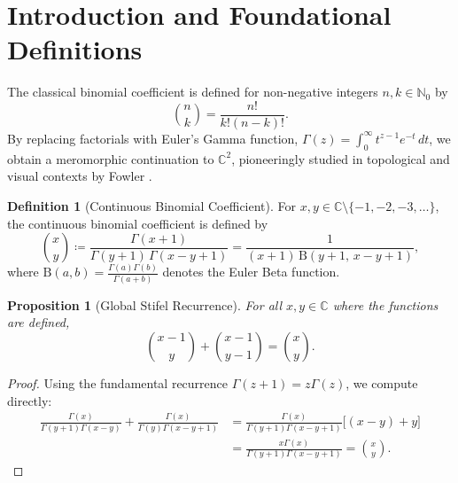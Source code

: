\documentclass[11pt,a4paper]{article}
\theoremstyle{plain}
\newtheorem{proposition}[theorem]{Proposition}
\theoremstyle{definition}
\newtheorem{definition}[theorem]{Definition}
\theoremstyle{remark}
\numberwithin{equation}{section}
\begin{document}
\tableofcontents
\newpage

\section{Introduction and Foundational Definitions}

The classical binomial coefficient is defined for non-negative integers $n, k \in \mathbb{N}_0$ by
\begin{equation}
\binom{n}{k} = \frac{n!}{k!(n-k)!}.
\end{equation}
By replacing factorials with Euler's Gamma function, $\Gamma(z) = \int_0^\infty t^{z-1}e^{-t}\,dt$, we obtain a meromorphic continuation to $\mathbb{C}^2$, pioneeringly studied in topological and visual contexts by Fowler \cite{fowler1996}.

\begin{definition}[Continuous Binomial Coefficient]
For $x, y \in \mathbb{C} \setminus \{-1, -2, -3, \dots\}$, the continuous binomial coefficient is defined by
\begin{equation}
\binom{x}{y} \coloneqq \frac{\Gamma(x+1)}{\Gamma(y+1)\,\Gamma(x-y+1)} = \frac{1}{(x+1)\,\mathrm{B}(y+1,\, x-y+1)},
\end{equation}
where $\mathrm{B}(a, b) = \frac{\Gamma(a)\Gamma(b)}{\Gamma(a+b)}$ denotes the Euler Beta function.
\end{definition}

\begin{proposition}[Global Stifel Recurrence]
For all $x, y \in \mathbb{C}$ where the functions are defined,
\begin{equation}
\binom{x-1}{y} + \binom{x-1}{y-1} = \binom{x}{y}.
\end{equation}
\end{proposition}
\begin{proof}
Using the fundamental recurrence $\Gamma(z+1) = z\Gamma(z)$, we compute directly:
\begin{align*}
\frac{\Gamma(x)}{\Gamma(y+1)\Gamma(x-y)} + \frac{\Gamma(x)}{\Gamma(y)\Gamma(x-y+1)} 
&= \frac{\Gamma(x)}{\Gamma(y+1)\Gamma(x-y+1)}\Big[(x-y) + y\Big] \\
&= \frac{x\Gamma(x)}{\Gamma(y+1)\Gamma(x-y+1)} = \binom{x}{y}.
\end{align*}
\end{proof}
\end{document}
